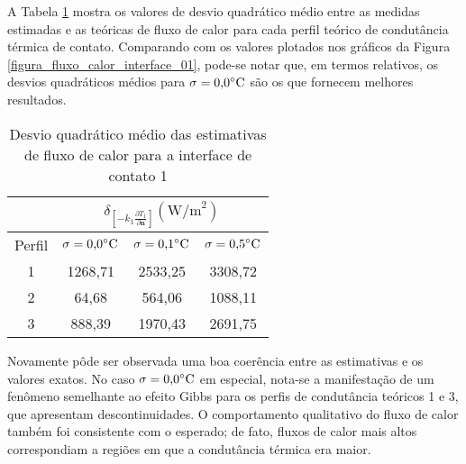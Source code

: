 A Tabela \ref{tabela_rms_fluxo_calor_interface_1} mostra os valores de desvio quadrático médio entre as medidas estimadas e as teóricas de fluxo de calor para cada perfil teórico de condutância térmica de contato. Comparando com os valores plotados nos gráficos da Figura \ref{figura_fluxo_calor_interface_01}, pode-se notar que, em termos relativos, os desvios quadráticos médios para $\sigma = \text{0,0}\celsius$ são os que fornecem melhores resultados.
\begin{table}[H]
	\centering
	\caption{Desvio quadrático médio das estimativas de fluxo de calor para a interface de contato 1}
	\begin{tabular}{c|c|c|c|}
		\cline{2-4}
		& \multicolumn{3}{c|}{$\delta_{\left[-k_1 \frac{\partial T_1}{\partial \mathbf{n}}\right]}(\text{W/m}^2)$} \\ \hline
		\multicolumn{1}{|c|}{Perfil} & $\sigma = \text{0,0}\celsius$   & $\sigma = \text{0,1}\celsius$    & $\sigma = \text{0,5}\celsius$  \\ \hline
		\multicolumn{1}{|c|}{1}      & 1268,71        &  2533,25      & 3308,72          \\ \hline
		\multicolumn{1}{|c|}{2}      & 64,68       &  564,06      &  1088,11     \\ \hline
		\multicolumn{1}{|c|}{3}      & 888,39        & 1970,43       & 2691,75        \\ \hline
	\end{tabular}
	\label{tabela_rms_fluxo_calor_interface_1}
\end{table}

Novamente pôde ser observada uma boa coerência entre as estimativas e os valores exatos. No caso $\sigma = \text{0,0}\celsius$ em especial, nota-se a manifestação de um fenômeno semelhante ao efeito Gibbs\citep{livro_boyce} para os perfis de condutância teóricos 1 e 3, que apresentam descontinuidades. O comportamento qualitativo do fluxo de calor também foi consistente com o esperado; de fato, fluxos de calor mais altos correspondiam a regiões em que a condutância térmica era maior.

